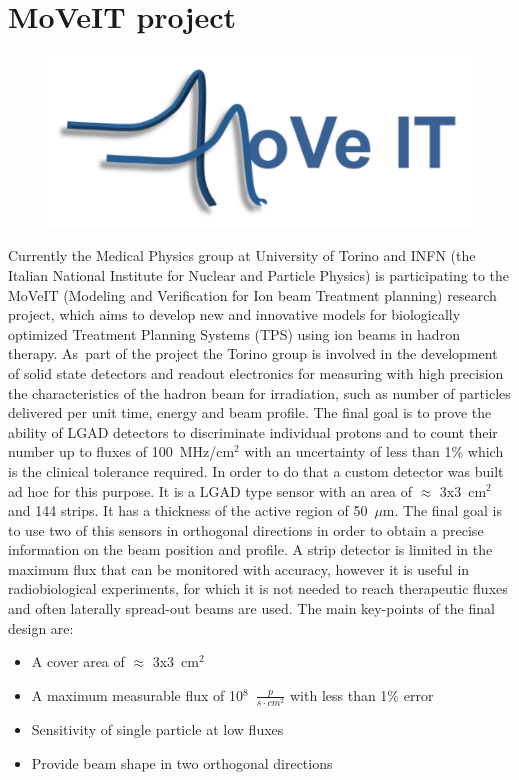 \section{MoVeIT project}\label{moveit}
\begin{figure}[H]
	\centering
	\includegraphics[width=0.35\linewidth]{IMG/ch2/Move_IT_logo}
\end{figure}
\noindent Currently the Medical Physics group at University of Torino and INFN (the Italian National Institute for
Nuclear and Particle Physics) is participating to the MoVeIT\cite{moveit} (Modeling and Verification for Ion beam Treatment planning)
research project, which aims to develop new and
innovative models for biologically optimized Treatment Planning Systems (TPS) using ion beams in hadron therapy.
As~part of the project the Torino group is involved in the development of solid state detectors and readout electronics for measuring with high precision
the characteristics of the hadron beam for irradiation, such as number of particles delivered per unit time, energy and beam profile.
The final goal is to prove the ability of LGAD detectors to discriminate individual protons and to count their number up to fluxes of 100~MHz/cm$^2$ with an uncertainty of less than 1\% which is the clinical tolerance required.
In order to do that a custom detector was built ad hoc for this purpose. It is a LGAD type sensor with an area of $\approx$ 3x3~cm$^2$ and 144 strips. It has a thickness of the active region of 50~$\mu$m.
The final goal is to use two of this sensors in orthogonal directions in order to obtain a precise information on the beam position and profile.
A strip detector is limited in the maximum flux that can be monitored with accuracy, however it is useful in radiobiological experiments, for which it is not needed to reach therapeutic fluxes and often laterally spread-out beams are used\cite{hammad}.
The main key-points of the final design are:
\begin{itemize}
	\item A cover area of $\approx$ 3x3~cm$^2$
	\item A maximum measurable flux of 10$^8$~$\frac{p}{s \cdot cm^2}$ with less than 1\% error
	\item Sensitivity of single particle at low fluxes
	\item Provide beam shape in two orthogonal directions
\end{itemize}


